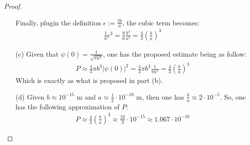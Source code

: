 \documentclass{article}
\begin{document}
\begin{proof}
\begin{itemize}
        Finally, plugin the definition $\epsilon:= \frac{2b}{a}$, the cubic term becomes:
        \begin{align}
            \frac{1}{6}\epsilon^3 =\frac{8}{6}\frac{b^3}{a^3} = \frac{4}{3}\left(\frac{b}{a}\right)^3
        \end{align}

        \hfil

        \item[(c)] Given that $\psi(0) = \frac{1}{\sqrt{\pi a^3}}$, one has the proposed estimate being as follow:
        \begin{align}
            P \approx \frac{4}{3}\pi b^3|\psi(0)|^2 = \frac{4}{3}\pi b^3 \frac{1}{\pi a^3} = \frac{4}{3}\left(\frac{b}{a}\right)^3
        \end{align}
        Which is exactly as what is proposed in part (b).

        \hfil

        \item[(d)] Given $b\approx 10^{-15}$ m and $a\approx \frac{1}{2}\cdot 10^{-10}$ m, then one has $\frac{b}{a} \approx 2\cdot 10^{-5}$. So, one has the following approximation of $P$:
        \begin{align}
            P\approx \frac{4}{3}\left(\frac{b}{a}\right)^3 \approx \frac{32}{3}\cdot 10^{-15}\approx 1.067\cdot 10^{-16}
        \end{align}
    \end{itemize}
\end{proof}
\end{document}
